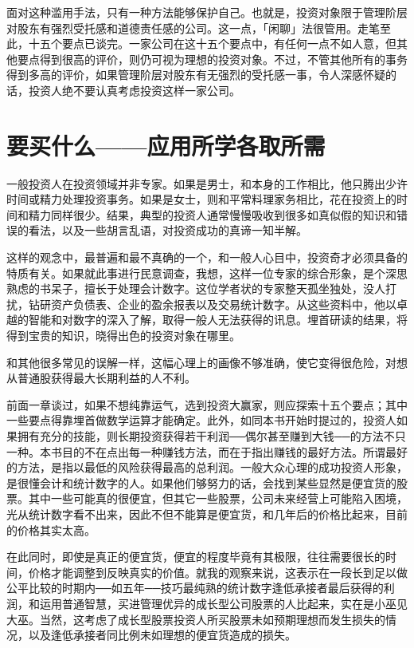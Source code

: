 \documentclass[UTF8,a4paper,zihao=-4,fontset = windows]{ctexart} %
\begin{document}
面对这种滥用手法，只有一种方法能够保护自己。也就是，投资对象限于管理阶层对股东有强烈受托感和道德责任感的公司。这一点，「闲聊」法很管用。走笔至此，十五个要点已谈完。一家公司在这十五个要点中，有任何一点不如人意，但其他要点得到很高的评价，则仍可视为理想的投资对象。不过，不管其他所有的事务得到多高的评价，如果管理阶层对股东有无强烈的受托感一事，令人深感怀疑的话，投资人绝不要认真考虑投资这样一家公司。

\section{要买什么——应用所学各取所需}

一般投资人在投资领域并非专家。如果是男士，和本身的工作相比，他只腾出少许时间或精力处理投资事务。如果是女士，则和平常料理家务相比，花在投资上的时间和精力同样很少。结果，典型的投资人通常慢慢吸收到很多如真似假的知识和错误的看法，以及一些胡言乱语，对投资成功的真谛一知半解。

这样的观念中，最普遍和最不真确的一个，和一般人心目中，投资奇才必须具备的特质有关。如果就此事进行民意调查，我想，这样一位专家的综合形象，是个深思熟虑的书呆子，擅长于处理会计数字。这位学者状的专家整天孤坐独处，没人打扰，钻研资产负债表、企业的盈余报表以及交易统计数字。从这些资料中，他以卓越的智能和对数字的深入了解，取得一般人无法获得的讯息。埋首研读的结果，将得到宝贵的知识，晓得出色的投资对象在哪里。

和其他很多常见的误解一样，这幅心理上的画像不够准确，使它变得很危险，对想从普通股获得最大长期利益的人不利。

前面一章谈过，如果不想纯靠运气，选到投资大赢家，则应探索十五个要点；其中一些要点得靠埋首做数学运算才能确定。此外，如同本书开始时提过的，投资人如果拥有充分的技能，则长期投资获得若干利润──偶尔甚至赚到大钱──的方法不只一种。本书目的不在点出每一种赚钱方法，而在于指出赚钱的最好方法。所谓最好的方法，是指以最低的风险获得最高的总利润。一般大众心理的成功投资人形象，是很懂会计和统计数字的人。如果他们够努力的话，会找到某些显然是便宜货的股票。其中一些可能真的很便宜，但其它一些股票，公司未来经营上可能陷入困境，光从统计数字看不出来，因此不但不能算是便宜货，和几年后的价格比起来，目前的价格其实太高。

在此同时，即使是真正的便宜货，便宜的程度毕竟有其极限，往往需要很长的时间，价格才能调整到反映真实的价值。就我的观察来说，这表示在一段长到足以做公平比较的时期内──如五年──技巧最纯熟的统计数字逢低承接者最后获得的利润，和运用普通智慧，买进管理优异的成长型公司股票的人比起来，实在是小巫见大巫。当然，这考虑了成长型股票投资人所买股票未如预期理想而发生损失的情况，以及逢低承接者同比例未如理想的便宜货造成的损失。
\end{document}
